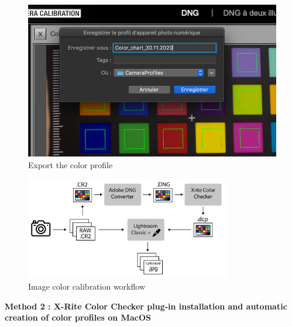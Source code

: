\documentclass[
]{book}
\begin{document}
\begin{figure}
\hypertarget{color_checker_profile}{%
\centering
\includegraphics[width=1\textwidth,height=\textheight]{Figures/create_profile.png}
\caption{Export the color
profile}\label{color_checker_profile}
}
\end{figure}

\begin{figure}
\hypertarget{fig:workflow}{%
\centering
\includegraphics[width=0.8\textwidth,height=\textheight]{Figures/manual_method.png}
\caption{Image color calibration
workflow}\label{fig:workflow}
}
\end{figure}

\textbf{Method 2 : X-Rite Color Checker plug-in installation and automatic
creation of color profiles on MacOS}
\end{document}
